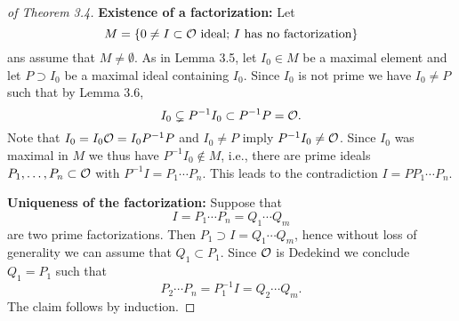 \begin{proof}[of Theorem 3.4]
	\textbf{Existence of a factorization:} Let
	\[ M = \left\{  0 \neq I \subset \mathcal{O} \text{ ideal; $I$ has no factorization} \right\}
	\]
	ans assume that $M\neq \emptyset$. As in Lemma 3.5, let $I_0 \in M$ be a maximal element and let $P \supset I_0$ be a maximal ideal containing $I_0$.
	Since $I_0$ is not prime we have $I_0 \neq P$ such that by Lemma 3.6,
	\[ I_0 \subsetneq P^{-1} I_0 \subset P^{-1} P = \mathcal{O}.
	\]
	Note that $I_0 = I_0 \mathcal{O} = I_0 P^{-1} P$ and $I_0 \neq P$ imply $P^{-1}I_0 \neq \mathcal{O}$.
	Since $I_0$ was maximal in $M$ we thus have $P^{-1}I_0 \not \in M$, i.e., there are prime ideals $P_1, \dots, P_n \subset \mathcal{O}$ with $P^{-1} I = P_1 \cdots P_n$.
	This leads to the contradiction $I=PP_1 \cdots P_n$.
	
	\bigskip \textbf{Uniqueness of the factorization:} Suppose that
	\[ I=P_1 \cdots P_n =Q_1 \cdots Q_m
	\]
	are two prime factorizations. Then $P_1 \supset I =Q_1 \cdots Q_m$, hence without loss of generality we can assume that $Q_1 \subset P_1$. Since $\mathcal{O}$ is Dedekind we conclude $Q_1 = P_1$ such that 
	\[ P_2 \cdots P_n = P_1^{-1} I = Q_2 \cdots Q_m.
	\]
	The claim follows by induction.
\end{proof}


































